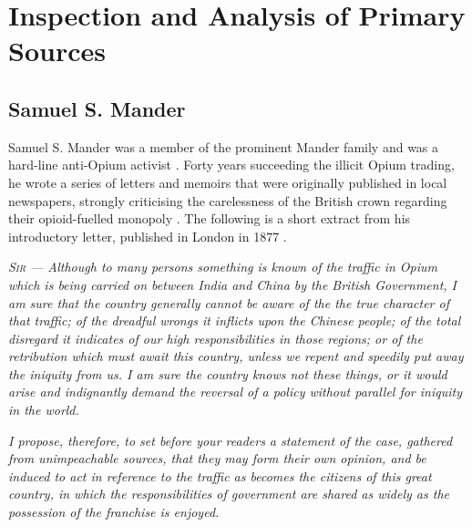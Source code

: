 \documentclass{article}
\newcommand{\textrule}{\noindent\makebox[\linewidth]{\rule{\linewidth}{0.4pt}}}
\begin{document}
\section{Inspection and Analysis of Primary Sources}

\subsection{Samuel S. Mander}

Samuel S. Mander was a member of the prominent Mander family and was a hard-line anti-Opium activist
\autocite{Rimner:2018}. Forty years succeeding the illicit Opium trading, he wrote a series of letters and memoirs that were originally published in local newspapers, strongly criticising the carelessness of the British crown regarding their opioid-fuelled monopoly \autocite{Brook:2000}. The following is a short extract from his introductory letter, published in London in 1877 \autocite{Mander:2015}.

\textrule
\vspace*{0.6em}
\textit{\textsc{Sir} --- Although to many persons something is known of the traffic in Opium which is being carried on between India and China by the British Government, I am sure that the country generally cannot be aware of the the true character of that traffic; of the dreadful wrongs it inflicts upon the Chinese people; of the total disregard it indicates of our high responsibilities in those regions; or of the retribution which must await this country, unless we repent and speedily put away the iniquity from us. I am sure the country knows not these things, or it would arise and indignantly demand the reversal of a policy without parallel for iniquity in the world.}

\textit{I propose, therefore, to set before your readers a statement of the case, gathered from unimpeachable sources, that they may form their own opinion, and be induced to act in reference to the traffic as becomes the citizens of this great country, in which the responsibilities of government are shared as widely as the possession of the franchise is enjoyed.}
\end{document}
